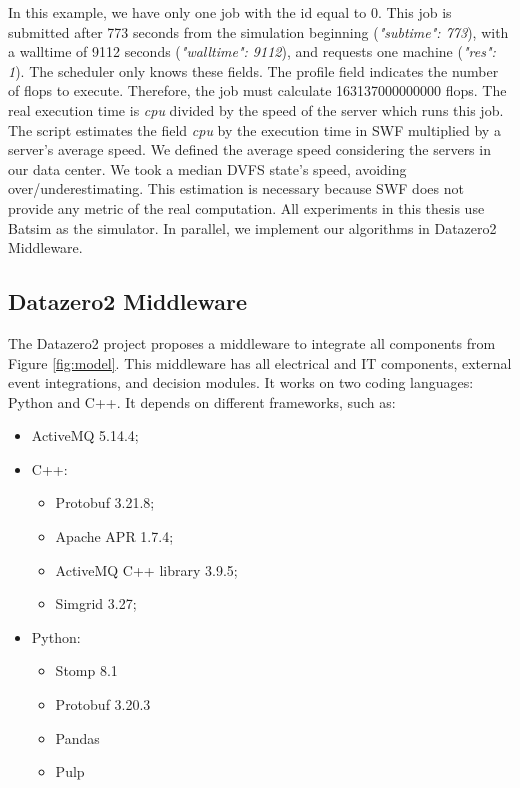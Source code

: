 In this example, we have only one job with the id equal to 0. This job is submitted after 773 seconds from the simulation beginning (\textit{"subtime": 773}), with a walltime of 9112 seconds (\textit{"walltime": 9112}), and requests one machine (\textit{"res": 1}). The scheduler only knows these fields. The profile field indicates the number of flops to execute. Therefore, the job must calculate 163137000000000 flops. The real execution time is \textit{cpu} divided by the speed of the server which runs this job. The script estimates the field \textit{cpu} by the execution time in SWF multiplied by a server's average speed. We defined the average speed considering the servers in our data center. We took a median DVFS state's speed, avoiding over/underestimating. This estimation is necessary because SWF does not provide any metric of the real computation. All experiments in this thesis use Batsim as the simulator. In parallel, we implement our algorithms in Datazero2 Middleware.

\subsection{Datazero2 Middleware}

The Datazero2 project proposes a middleware to integrate all components from Figure \ref{fig:model}. This middleware has all electrical and IT components, external event integrations, and decision modules. It works on two coding languages: Python and C++. It depends on different frameworks, such as:
\begin{itemize}
    \item ActiveMQ 5.14.4;
    \item C++:
    \begin{itemize}
        \item Protobuf 3.21.8;
        \item Apache APR 1.7.4;
        \item ActiveMQ C++ library 3.9.5;
        \item Simgrid 3.27;
    \end{itemize}
    \item Python:
    \begin{itemize}
        \item Stomp 8.1
        \item Protobuf 3.20.3
        \item Pandas
        \item Pulp
    \end{itemize}
\end{itemize}

